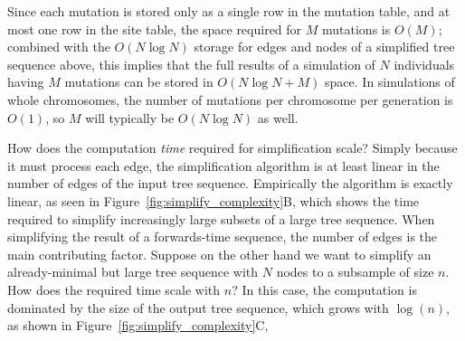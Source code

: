 \documentclass{article}
\begin{document}
Since each mutation is stored only as a single row in the mutation table,
and at most one row in the site table, the space required for $M$ mutations is $O(M)$;
combined with the $O(N \log N)$ storage for edges and nodes of a simplified tree sequence above,
this implies that the full results of a simulation of $N$ individuals
having $M$ mutations can be stored in $O(N \log N + M)$ space.
In simulations of whole chromosomes, the number of mutations per chromosome per generation is $O(1)$,
so $M$ will typically be $O(N \log N)$ as well.

How does the computation \emph{time} required for simplification scale?
Simply because it must process each edge,
the simplification algorithm is at least linear in the number of edges of the input tree sequence.
Empirically the algorithm is exactly linear,
as seen in Figure~\ref{fig:simplify_complexity}B,
which shows the time required to simplify increasingly large subsets of a large tree sequence.
When simplifying the result of a forwards-time sequence, the number of edges is the main contributing factor.
Suppose on the other hand we want to
simplify an already-minimal but large tree sequence with $N$ nodes
to a subsample of size $n$.
How does the required time scale with $n$?
In this case, the computation is dominated by the size of the output tree sequence,
which grows with $\log(n)$, as shown in Figure~\ref{fig:simplify_complexity}C,


\end{document}
